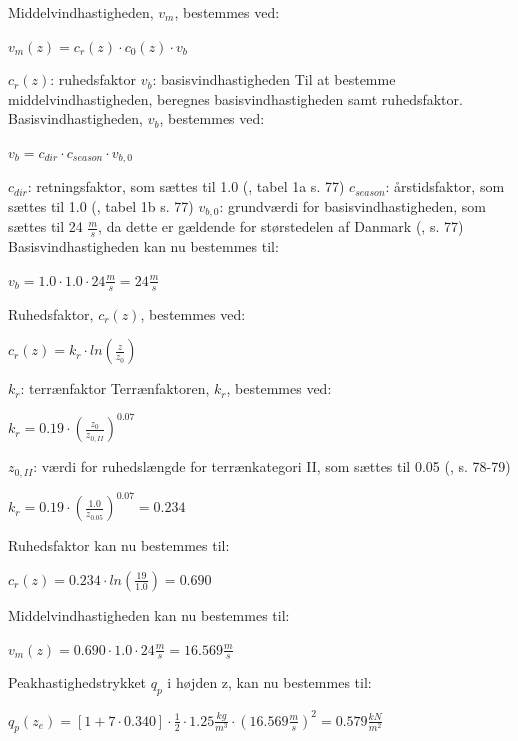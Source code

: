 Middelvindhastigheden, $v_m$, bestemmes ved:
\begin{center}
$v_m(z)=c_r(z)\cdot c_0(z)\cdot v_b$
\end{center}
$c_r(z)$: ruhedsfaktor
\newline
$v_b$: basisvindhastigheden
\newline
\newline
Til at bestemme middelvindhastigheden, beregnes basisvindhastigheden samt ruhedsfaktor.
\newline
\newline
Basisvindhastigheden, $v_b$, bestemmes ved:
\begin{center}
$v_b=c_{dir}\cdot c_{season}\cdot v_{b,0}$
\end{center}
$c_{dir}$: retningsfaktor, som sættes til 1.0 (\citep{EU91}, tabel 1a s. 77)
\newline
$c_{season}$: årstidsfaktor, som sættes til 1.0 (\citep{EU91}, tabel 1b s. 77)
\newline
$v_{b,0}$: grundværdi for basisvindhastigheden, som sættes til 24 $\frac{m}{s}$, da dette er gældende for størstedelen af Danmark (\citep{EU91}, s. 77)
\newline
\newline
Basisvindhastigheden kan nu bestemmes til:
\begin{center}
$v_b=1.0\cdot 1.0\cdot 24 \frac{m}{s}=24 \frac{m}{s}$
\end{center}
Ruhedsfaktor, $c_r(z)$, bestemmes ved:
\begin{center}
$c_r(z)=k_r\cdot ln(\frac{z}{z_0})$
\end{center}
$k_r$: terrænfaktor
\newline
\newline
Terrænfaktoren, $k_r$, bestemmes ved:
\begin{center}
$k_r=0.19\cdot (\frac{z_0}{z_{0,II}})^{0.07}$
\end{center}
$z_{0,II}$: værdi for ruhedslængde for terrænkategori II, som sættes til 0.05 (\citep{EU91}, s. 78-79)
\begin{center}
$k_r=0.19\cdot (\frac{1.0}{z_{0.05}})^{0.07}=0.234$
\end{center}
Ruhedsfaktor kan nu bestemmes til:
\begin{center}
$c_r(z)=0.234\cdot ln(\frac{19}{1.0})=0.690$
\end{center}
Middelvindhastigheden kan nu bestemmes til:
\begin{center}
$v_m(z)=0.690\cdot 1.0\cdot 24 \frac{m}{s}=16.569 \frac{m}{s}$
\end{center}
Peakhastighedstrykket $q_p$ i højden z, kan nu bestemmes til:
\begin{center}
$q_p(z_e)=[1+7\cdot 0.340]\cdot \frac{1}{2}\cdot 1.25 \frac{kg}{m^3}\cdot (16.569 \frac{m}{s})^2=0.579 \frac{kN}{m^2}$
\end{center}
